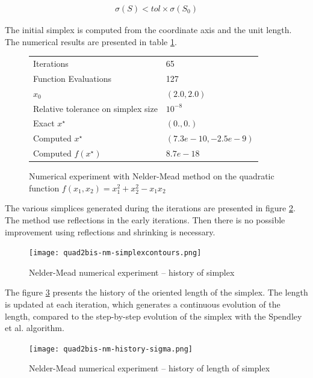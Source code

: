 \begin{eqnarray}
\sigma(S) < tol \times \sigma(S_0)
\end{eqnarray}

The initial simplex is computed from the coordinate axis and the unit length.
The numerical results are presented in table \ref{fig-nm-numexp1-table}.

\begin{figure}[htbp]
\begin{center}
\begin{tabular}{|l|l|}
\hline
Iterations & 65 \\
Function Evaluations & 127 \\
$x_0$ & $(2.0,2.0)$ \\
Relative tolerance on simplex size & $10^{-8}$ \\
Exact $x^\star$ & $(0.,0.)$\\
Computed $x^\star$ & $(7.3e-10 , -2.5e-9)$\\
Computed $f(x^\star)$ & $8.7e-18$\\
\hline
\end{tabular}
\end{center}
\caption{Numerical experiment with Nelder-Mead method on the quadratic function
$f(x_1,x_2) = x_1^2 + x_2^2 - x_1 x_2$}
\label{fig-nm-numexp1-table}
\end{figure}


The various simplices generated during the iterations are 
presented in figure \ref{fig-nm-numexp1-historysimplex}.
The method use reflections in the early iterations. Then there
is no possible improvement using reflections and shrinking is necessary.

\begin{figure}
\begin{center}
\texttt{[image: quad2bis-nm-simplexcontours.png]}
\end{center}
\caption{Nelder-Mead numerical experiment -- history of simplex}
\label{fig-nm-numexp1-historysimplex}
\end{figure}

The figure \ref{fig-nm-numexp1-sigma} presents the history of the oriented
length of the simplex. The length is updated at each iteration, which 
generates a continuous evolution of the length, compared to the 
step-by-step evolution of the simplex with the Spendley et al. algorithm.

\begin{figure}
\begin{center}
\texttt{[image: quad2bis-nm-history-sigma.png]}
\end{center}
\caption{Nelder-Mead numerical experiment -- history of length of simplex}
\label{fig-nm-numexp1-sigma}
\end{figure}

